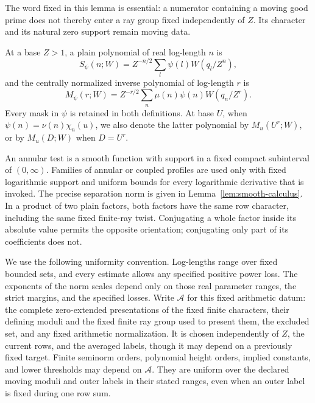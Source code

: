 \documentclass[11pt,a4paper]{article}
\numberwithin{equation}{section}
\numberwithin{figure}{section}
\theoremstyle{definition}
\theoremstyle{remark}
\begin{document}
The word fixed in this lemma is essential: a numerator containing a moving
good prime does not thereby enter a ray group fixed independently of $Z$.
Its character and its natural zero support remain moving data.

At a base $Z>1$, a plain polynomial of real log-length $n$ is
\begin{equation}
 S_\psi(n;W)=Z^{-n/2}\sum_l\psi(l)W(q_l/Z^n),
 \label{old-eq:1.1}
\end{equation}
and the centrally normalized inverse polynomial of log-length $r$ is
\begin{equation}
 M_\psi(r;W)=Z^{-r/2}\sum_n\mu(n)\psi(n)W(q_n/Z^r).
 \label{old-eq:1.1a}
\end{equation}
Every mask in $\psi$ is retained in both definitions.  At base $U$, when
$\psi(n)=\nu(n)\chi_n(u)$, we also denote the latter polynomial by
$M_u(U^r;W)$, or by $M_u(D;W)$ when $D=U^r$.

An annular test is a smooth function with support in a fixed compact
subinterval of $(0,\infty)$.  Families of annular or coupled profiles are
used only with fixed logarithmic support and uniform bounds for every
logarithmic derivative that is invoked.  The precise separation norm is
given in Lemma~\ref{lem:smooth-calculus}.  In a product of two plain factors,
both factors have the same row character, including the same fixed finite-ray
twist.  Conjugating a whole factor inside its absolute value permits the
opposite orientation; conjugating only part of its coefficients does not.

We use the following uniformity convention.  Log-lengths range over fixed
bounded sets, and every estimate allows any specified positive power loss.
The exponents of the norm scales depend only on those real parameter ranges,
the strict margins, and the specified losses.
Write $\mathcal A$ for this fixed arithmetic datum: the complete zero-extended
presentations of the fixed finite characters, their defining moduli and the
fixed finite ray group used to present them, the excluded set, and any fixed
arithmetic normalization.  It is chosen independently of $Z$, the current
rows, and the averaged labels, though it may depend on a previously fixed
target.  Finite seminorm orders, polynomial height orders,
implied constants, and lower thresholds may depend on $\mathcal A$.  They
are uniform over the declared moving moduli and outer labels in their stated
ranges, even when an outer label is fixed during one row sum.
\end{document}
